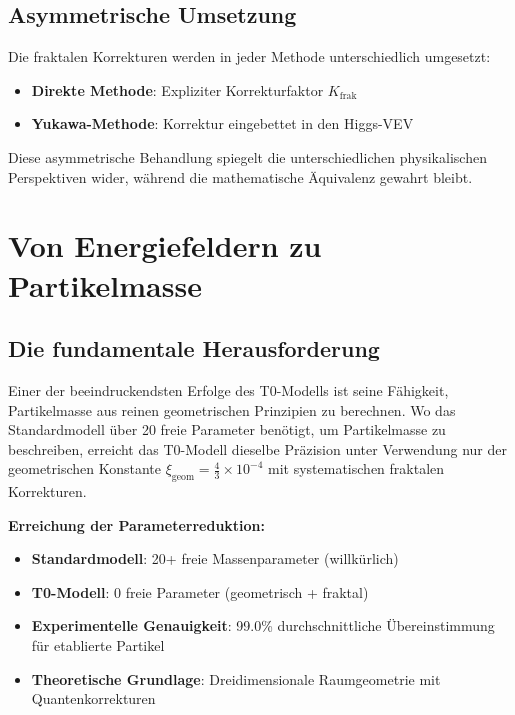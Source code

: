 \documentclass[12pt,a4paper]{article}
\newcommand{\xigeom}{\xi_{\text{geom}}}
\begin{document}
	\subsection{Asymmetrische Umsetzung}
	\label{subsec:asymmetric_implementation}
	
	Die fraktalen Korrekturen werden in jeder Methode unterschiedlich umgesetzt:
	\begin{itemize}
		\item \textbf{Direkte Methode}: Expliziter Korrekturfaktor $K_{\text{frak}}$
		\item \textbf{Yukawa-Methode}: Korrektur eingebettet in den Higgs-VEV
	\end{itemize}
	
	Diese asymmetrische Behandlung spiegelt die unterschiedlichen physikalischen Perspektiven wider, w\"a{}hrend die mathematische \"A{}quivalenz gewahrt bleibt.
	
	\section{Von Energiefeldern zu Partikelmasse}
	\label{sec:energy_fields_to_masses}
	
	\subsection{Die fundamentale Herausforderung}
	\label{subsec:fundamental_challenge}
	
	Einer der beeindruckendsten Erfolge des T0-Modells ist seine F\"a{}higkeit, Partikelmasse aus reinen geometrischen Prinzipien zu berechnen. Wo das Standardmodell \"u{}ber 20 freie Parameter ben\"o{}tigt, um Partikelmasse zu beschreiben, erreicht das T0-Modell dieselbe Pr\"a{}zision unter Verwendung nur der geometrischen Konstante $\xigeom = \frac{4}{3} \times 10^{-4}$ mit systematischen fraktalen Korrekturen.
	
	\begin{tcolorbox}[colback=green!5!white,colframe=green!75!black,title=Masse-Revolution]
		\textbf{Erreichung der Parameterreduktion:}
		\begin{itemize}
			\item \textbf{Standardmodell}: 20+ freie Massenparameter (willk\"u{}rlich)
			\item \textbf{T0-Modell}: 0 freie Parameter (geometrisch + fraktal)
			\item \textbf{Experimentelle Genauigkeit}: 99.0\% durchschnittliche \"U{}bereinstimmung f\"ur etablierte Partikel
			\item \textbf{Theoretische Grundlage}: Dreidimensionale Raumgeometrie mit Quantenkorrekturen
		\end{itemize}
	\end{tcolorbox}
	
\end{document}
